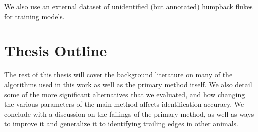 We also use an external dataset of unidentified (but annotated) humpback flukes for training models.

\section{Thesis Outline}

The rest of this thesis will cover the background literature on many of the algorithms used in this work as well as the primary method itself.
We also detail some of the more significant alternatives that we evaluated, and how changing the various parameters of the main method affects identification accuracy.
We conclude with a discussion on the failings of the primary method, as well as ways to improve it and generalize it to identifying trailing edges in other animals.





